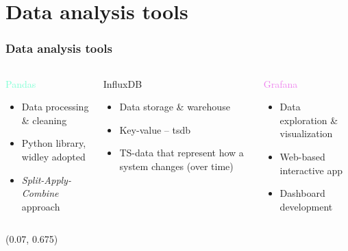 \section{Data analysis tools}
\SectionPage

\begin{frame}
    \frametitle{Data analysis tools}
    \vspace*{\fill}
    \begin{columns}[onlytextwidth, t]
        \begin{column}{.33\textwidth}
            \centering
            \textcolor{Aquamarine}{\Large Pandas}
            \vspace{0.5cm}

            \begin{itemize}
                \item Data processing \& cleaning
                \item Python library, widley adopted
                \item \textit{Split-Apply-Combine} approach
            \end{itemize}
        \end{column}

        \begin{column}{.33\textwidth}
            \centering
            \textcolor{YellowOrange}{\Large InfluxDB}
            \vspace{0.5cm}

            \begin{itemize}
                \item Data storage \& warehouse
                \item Key-value -- \acl{tsdb}
                \item TS-data that represent how a system changes (over time)
            \end{itemize}
        \end{column}

        \begin{column}{.33\textwidth}
            \centering
            \textcolor{violet}{\Large Grafana}
            \vspace{0.5cm}

            \begin{itemize}
                \item Data exploration \& visualization
                \item Web-based interactive app
                \item Dashboard development
            \end{itemize}
        \end{column}
    \end{columns}

    \begin{textblock}{1}(0.07, 0.675)
    \end{textblock}

    \vspace*{\fill}
\end{frame}